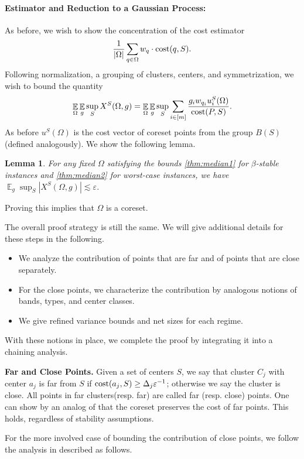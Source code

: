 \documentclass[11pt]{article}
\newtheorem{lemma}{Lemma}[section]
\theoremstyle{restate}
\theoremstyle{definition}
\newcommand{\eps}{\ensuremath{\varepsilon}}
\newcommand{\E}{\mathop{\mathbb{E}}}
\newcommand{\cost}{\textnormal{cost}}
\begin{document}
\noindent \paragraph{Estimator and Reduction to a Gaussian Process:} As before, we wish to show the concentration of the cost estimator 
 $$\frac{1}{|\Omega|}\sum_{q\in \Omega}w_q\cdot \cost(q,S).$$
Following normalization, a grouping of clusters, centers, and symmetrization, we wish to bound the quantity
$$\E_{\Omega} \E_g \sup_{S}X^S(\Omega, g) =  \E_{\Omega} \E_g \sup_{S}\sum_{i \in [m]} \frac{g_i w_{q_i} u_i^S(\Omega)}{\cost(P,S)}.$$
As before $u^S(\Omega)$ is the cost vector of coreset points from the group $B(S)$ (defined analogously). We show the following lemma.
\begin{lemma}
    For any fixed $\Omega$ satisfying the bounds \cref{thm:median1} for $\beta$-stable instances and \cref{thm:median2} for worst-case instances, we have 
    $ \E_{g} \sup_{S} \left\lvert X^S(\Omega,g)\right\rvert \lesssim \eps $.
\end{lemma}
Proving this implies that $\Omega$ is a coreset.

The overall proof strategy is still the same. We will give additional details for these steps in the following. 
\begin{itemize}
    \item We analyze the contribution of points that are far and of points that are close separately. 
    \item For the close points, we characterize the contribution by analogous notions of bands, types, and center classes.
    \item We give refined variance bounds and net sizes for each regime.
\end{itemize}
With these notions in place, we complete the proof by integrating it into a chaining analysis.

\noindent \textbf{Far and Close Points.} 
Given a set of centers $S$, we say that cluster $C_j$ with center $a_j$ is far from $S$ if  $ \cost(a_j, S) \geq \Delta_j \eps^{-1}$; otherwise we say the cluster is close. All points in far clusters(resp. far) are called far (resp. close) points.  One can show by an analog of  that the coreset preserves the cost of far points. This holds, regardless of stability assumptions. 


For the more involved case of bounding the contribution of close points, we follow the analysis in  described as follows.
\end{document}
